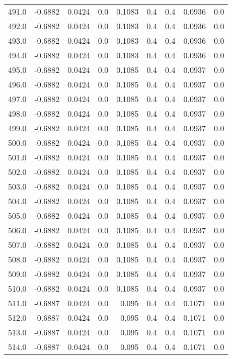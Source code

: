\begin{longtable}{lrrrrrrrr}
491.0 & -0.6882 & 0.0424 & 0.0 & 0.1083 & 0.4 & 0.4 & 0.0936 & 0.0 \\
492.0 & -0.6882 & 0.0424 & 0.0 & 0.1083 & 0.4 & 0.4 & 0.0936 & 0.0 \\
493.0 & -0.6882 & 0.0424 & 0.0 & 0.1083 & 0.4 & 0.4 & 0.0936 & 0.0 \\
494.0 & -0.6882 & 0.0424 & 0.0 & 0.1083 & 0.4 & 0.4 & 0.0936 & 0.0 \\
495.0 & -0.6882 & 0.0424 & 0.0 & 0.1085 & 0.4 & 0.4 & 0.0937 & 0.0 \\
496.0 & -0.6882 & 0.0424 & 0.0 & 0.1085 & 0.4 & 0.4 & 0.0937 & 0.0 \\
497.0 & -0.6882 & 0.0424 & 0.0 & 0.1085 & 0.4 & 0.4 & 0.0937 & 0.0 \\
498.0 & -0.6882 & 0.0424 & 0.0 & 0.1085 & 0.4 & 0.4 & 0.0937 & 0.0 \\
499.0 & -0.6882 & 0.0424 & 0.0 & 0.1085 & 0.4 & 0.4 & 0.0937 & 0.0 \\
500.0 & -0.6882 & 0.0424 & 0.0 & 0.1085 & 0.4 & 0.4 & 0.0937 & 0.0 \\
501.0 & -0.6882 & 0.0424 & 0.0 & 0.1085 & 0.4 & 0.4 & 0.0937 & 0.0 \\
502.0 & -0.6882 & 0.0424 & 0.0 & 0.1085 & 0.4 & 0.4 & 0.0937 & 0.0 \\
503.0 & -0.6882 & 0.0424 & 0.0 & 0.1085 & 0.4 & 0.4 & 0.0937 & 0.0 \\
504.0 & -0.6882 & 0.0424 & 0.0 & 0.1085 & 0.4 & 0.4 & 0.0937 & 0.0 \\
505.0 & -0.6882 & 0.0424 & 0.0 & 0.1085 & 0.4 & 0.4 & 0.0937 & 0.0 \\
506.0 & -0.6882 & 0.0424 & 0.0 & 0.1085 & 0.4 & 0.4 & 0.0937 & 0.0 \\
507.0 & -0.6882 & 0.0424 & 0.0 & 0.1085 & 0.4 & 0.4 & 0.0937 & 0.0 \\
508.0 & -0.6882 & 0.0424 & 0.0 & 0.1085 & 0.4 & 0.4 & 0.0937 & 0.0 \\
509.0 & -0.6882 & 0.0424 & 0.0 & 0.1085 & 0.4 & 0.4 & 0.0937 & 0.0 \\
510.0 & -0.6882 & 0.0424 & 0.0 & 0.1085 & 0.4 & 0.4 & 0.0937 & 0.0 \\
511.0 & -0.6887 & 0.0424 & 0.0 & 0.095 & 0.4 & 0.4 & 0.1071 & 0.0 \\
512.0 & -0.6887 & 0.0424 & 0.0 & 0.095 & 0.4 & 0.4 & 0.1071 & 0.0 \\
513.0 & -0.6887 & 0.0424 & 0.0 & 0.095 & 0.4 & 0.4 & 0.1071 & 0.0 \\
514.0 & -0.6887 & 0.0424 & 0.0 & 0.095 & 0.4 & 0.4 & 0.1071 & 0.0 \\

\end{longtable}
